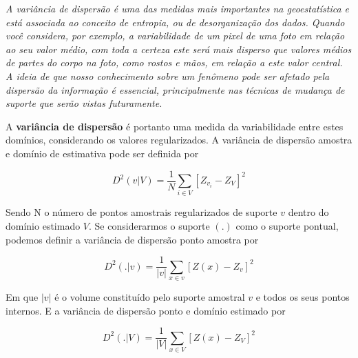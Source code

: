 \begin{proposition}
	\textit{A variância de dispersão é uma das medidas mais importantes na geoestatística e está associada ao conceito de entropia, ou de desorganização dos dados. Quando você considera, por exemplo, a variabilidade de um pixel de uma foto em relação ao seu valor médio, com toda a certeza este será mais disperso que valores médios de partes do corpo na foto, como rostos e mãos, em relação a este valor central. A ideia de que nosso conhecimento sobre um fenômeno pode ser afetado pela dispersão da informação é essencial, principalmente nas técnicas de mudança de suporte que serão vistas futuramente.}
\end{proposition}

A \textbf{variância de dispersão} é portanto uma medida da variabilidade entre estes domínios, considerando os valores regularizados. A variância de dispersão amostra e domínio de estimativa pode ser definida por


\begin{equation}
D^{2}(v|V) = \frac{1}{N}\sum_{i \in V}[Z_{v_{i}} - Z_{V}]^{2}
\end{equation}

Sendo N o número de pontos amostrais regularizados de suporte $v$ dentro do domínio estimado $V$. Se considerarmos o suporte $(.)$ como o suporte pontual, podemos definir a variância de dispersão ponto amostra por 

\begin{equation}
D^{2}(.|v) = \frac{1}{|v|}\sum_{x \in v}[Z(x) - Z_{v}]^{2}
\end{equation}

Em que $|v|$ é o volume constituído pelo suporte amostral $v$ e todos os seus pontos internos. E a variância de dispersão ponto e domínio estimado por 

\begin{equation}
D^{2}(.|V) = \frac{1}{|V|}\sum_{x \in V}[Z(x) - Z_{V}]^{2}
\end{equation}

